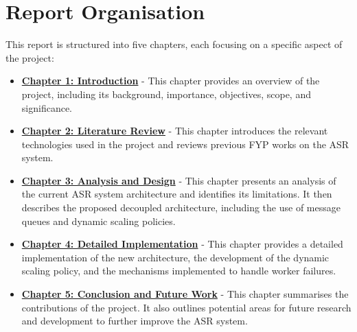 \section{Report Organisation}
This report is structured into five chapters, each focusing on a specific aspect of the project:

\begin{itemize}
    \item \hyperref[chapter:introduction]{\textbf{Chapter 1: Introduction}} - This chapter provides an overview of the project, including its background, importance, objectives, scope, and significance.
    
    \item \hyperref[chapter:literature_review]{\textbf{Chapter 2: Literature Review}} - This chapter introduces the relevant technologies used in the project and reviews previous FYP works on the ASR system.
    
    \item \hyperref[chapter:analysis_and_design]{\textbf{Chapter 3: Analysis and Design}} - This chapter presents an analysis of the current ASR system architecture and identifies its limitations. It then describes the proposed decoupled architecture, including the use of message queues and dynamic scaling policies.
    
    \item \hyperref[chapter:detailed_implementation]{\textbf{Chapter 4: Detailed Implementation}} - This chapter provides a detailed implementation of the new architecture, the development of the dynamic scaling policy, and the mechanisms implemented to handle worker failures.
    
    \item \hyperref[chapter:conclusion_and_future_work]{\textbf{Chapter 5: Conclusion and Future Work}} - This chapter summarises the contributions of the project. It also outlines potential areas for future research and development to further improve the ASR system.
\end{itemize}

